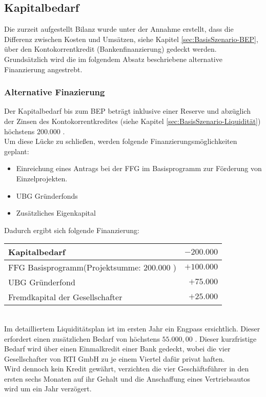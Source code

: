 \subsection{Kapitalbedarf}
Die zurzeit aufgestellt Bilanz wurde unter der Annahme erstellt, dass die Differenz zwischen Kosten und Umsätzen, siehe Kapitel \ref{sec:BasisSzenario-BEP}, über den Kontokorrentkredit (Bankenfinanzierung) gedeckt werden. Grundsätzlich wird die im folgendem Absatz beschriebene alternative Finanzierung angestrebt.

\subsubsection{Alternative Finazierung}
Der Kapitalbedarf bis zum BEP beträgt inklusive einer Reserve und abzüglich der Zinsen des Kontokorrentkredites (siehe Kapitel \ref{sec:BasisSzenario-Liquidität}) höchstens $200.000$ \officialeuro.\\
Um diese Lücke zu schließen, werden folgende Finanzierungsmöglichkeiten geplant:
\begin{itemize}
	\item Einreichung eines Antrags bei der FFG im Basisprogramm zur Förderung von Einzelprojekten.
	\item UBG Gründerfonds
	\item Zusätzliches Eigenkapital
\end{itemize}
Dadurch ergibt sich folgende Finanzierung:\\
\begin{tabular}{l r}
	Kapitalbedarf & $-200.000$ \officialeuro \\
	\hline
	FFG Basisprogramm(Projektsumme: $200.000$ \officialeuro) & $+100.000$ \officialeuro \\
	UBG Gründerfond & $+75.000$ \officialeuro \\
	Fremdkapital der Gesellschafter & $+25.000$ \officialeuro \\
	\bottomrule
\end{tabular}\\

\noindent Im detailliertem Liquiditätsplan ist im ersten Jahr ein Engpass ersichtlich. Dieser erfordert einen zusätzlichen Bedarf von höchstens $55.000,00$ \officialeuro. Dieser kurzfristige Bedarf wird über einen Einmalkredit  einer Bank gedeckt, wobei die vier Gesellschafter von \textsf{RTI GmbH} zu je einem Viertel dafür privat haften.\\
Wird dennoch kein Kredit gewährt, verzichten die vier Geschäftsführer in den ersten sechs Monaten auf ihr Gehalt und die Anschaffung eines Vertriebsautos wird um ein Jahr verzögert.\\

